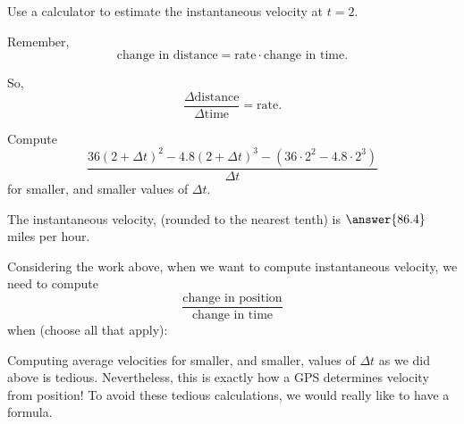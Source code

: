 \documentclass{ximera}
\begin{document}
\begin{problem}
  Use a calculator to estimate the instantaneous velocity at $t=2$.
  \begin{hint}
    Remember, 
    \[
    \text{change in distance} = \text{rate}\cdot\text{change in time}.
    \]
  \end{hint}
  \begin{hint}
    So, 
    \[
    \frac{\Delta\text{distance}}{\Delta\text{time}} = \text{rate}.
    \]
  \end{hint}
  \begin{hint}
    Compute
    \[
    \frac{36(2+\Delta t)^2 -4.8(2+\Delta t)^3 -\left(36\cdot 2^2 -4.8\cdot 2^3\right) }{\Delta t}
    \]
    for smaller, and smaller values of $\Delta t$.
  \end{hint}
  \begin{prompt}
    The instantaneous velocity, (rounded to the nearest tenth) is $\answer{86.4}$ miles per hour.
  \end{prompt}
\end{problem}


\begin{problem}
  Considering the work above, when we want to compute instantaneous
  velocity, we need to compute
  \[
  \frac{\text{change in position}}{\text{change in time}}
  \]
  when (choose all that apply):
 \begin{selectAll}
 \end{selectAll}
\end{problem}


Computing average velocities for smaller, and smaller, values of
$\Delta t$ as we did above is tedious. Nevertheless, this is exactly
how a GPS determines velocity from position! To avoid these tedious
calculations, we would really like to have a formula.



\end{document}
